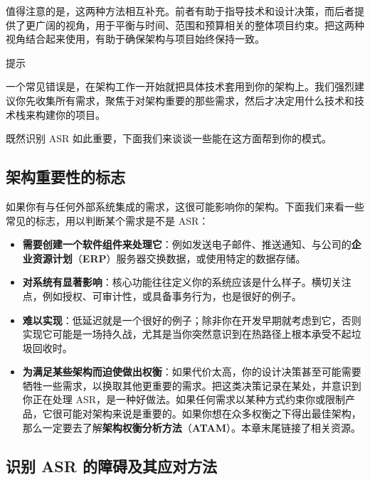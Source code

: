 
\label{idx:158}
值得注意的是，这两种方法相互补充。前者有助于指导技术和设计决策，而后者提供了更广阔的视角，用于平衡与时间、范围和预算相关的整体项目约束。把这两种视角结合起来使用，有助于确保架构与项目始终保持一致。

\begin{myTip}{提示}

一个常见错误是，在架构工作一开始就把具体技术套用到你的架构上。我们强烈建议你先收集所有需求，聚焦于对架构重要的那些需求，然后才决定用什么技术和技术栈来构建你的项目。
\end{myTip}

既然识别 ASR 如此重要，下面我们来谈谈一些能在这方面帮到你的模式。

\subsection{架构重要性的标志}

\label{idx:159}
如果你有与任何外部系统集成的需求，这很可能影响你的架构。下面我们来看一些常见的标志，用以判断某个需求是不是 ASR：

\begin{itemize}
\label{idx:160}
\item \textbf{需要创建一个软件组件来处理它}：例如发送电子邮件、推送通知、与公司的\textbf{企业资源计划}（\textbf{ERP}）服务器交换数据，或使用特定的数据存储。
\item \textbf{对系统有显著影响}：核心功能往往定义你的系统应该是什么样子。横切关注点，例如授权、可审计性，或具备事务行为，也是很好的例子。
\item \textbf{难以实现}：低延迟就是一个很好的例子；除非你在开发早期就考虑到它，否则实现它可能是一场持久战，尤其是当你突然意识到在热路径上根本承受不起垃圾回收时。
\label{idx:161}
\item \textbf{为满足某些架构而迫使做出权衡}：如果代价太高，你的设计决策甚至可能需要牺牲一些需求，以换取其他更重要的需求。把这类决策记录在某处，并意识到你正在处理 ASR，是一种好做法。如果任何需求以某种方式约束你或限制产品，它很可能对架构来说是重要的。如果你想在众多权衡之下得出最佳架构，那么一定要去了解\textbf{架构权衡分析方法}（\textbf{ATAM}）。本章末尾链接了相关资源。
\end{itemize}

\subsection{识别 ASR 的障碍及其应对方法}

